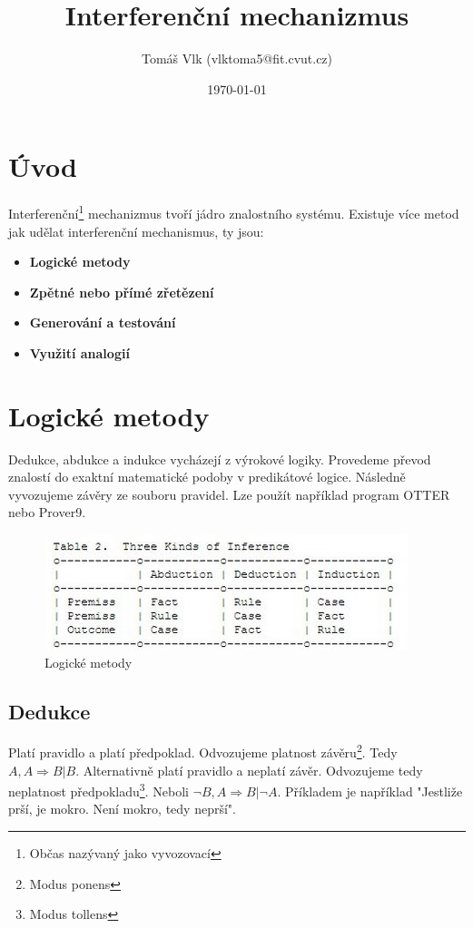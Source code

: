 \documentclass{article}
\title{Interferenční mechanizmus\vspace{-1em}}
\author{Tomáš Vlk (vlktoma5@fit.cvut.cz)}
\date{\today}
\begin{document}
\maketitle

\section*{Úvod}

Interferenční\footnote{Občas nazývaný jako vyvozovací} mechanizmus tvoří jádro znalostního systému. Existuje více metod jak udělat interferenční mechanismus, ty jsou:

\begin{itemize}
\item \textbf{Logické metody}
\item \textbf{Zpětné nebo přímé zřetězení}
\item \textbf{Generování a testování}
\item \textbf{Využití analogií}
\end{itemize}

\section*{Logické metody}

Dedukce, abdukce a indukce vycházejí z výrokové logiky. Provedeme převod znalostí do exaktní matematické podoby v predikátové logice. Následně vyvozujeme závěry ze souboru pravidel. Lze použít například program OTTER nebo Prover9.

\begin{figure}[h]
\begin{center}
\includegraphics[scale=0.7]{TKI.jpg}
\caption{Logické metody}
\end{center}
\end{figure}

\subsection*{Dedukce}

Platí pravidlo a platí předpoklad. Odvozujeme platnost závěru\footnote{Modus ponens}. Tedy $A, A \Rightarrow B | B$. Alternativně platí pravidlo a neplatí závěr. Odvozujeme tedy neplatnost předpokladu\footnote{Modus tollens}. Neboli $\neg B, A \Rightarrow B | \neg A$. Příkladem je například "Jestliže prší, je mokro. Není mokro, tedy neprší".\par
\end{document}
